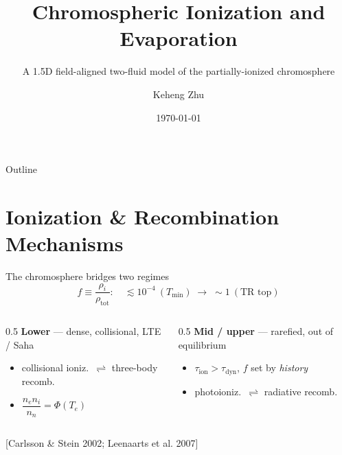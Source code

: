 \documentclass[aspectratio=169]{beamer}
\title[Chromospheric Ionization \& Evaporation]{Chromospheric Ionization and Evaporation}
\subtitle{A 1.5D field-aligned two-fluid model of the partially-ionized chromosphere}
\author{Keheng Zhu}
\institute{University of Michigan}
\date{\today}
\newcommand{\cit}[1]{{\scriptsize\color{gray}[#1]}}
\begin{document}
{
\begin{frame}\titlepage\end{frame}}

\begin{frame}{Outline}
  \tableofcontents
\end{frame}

\section{Ionization \& Recombination Mechanisms}
\begin{frame}{The chromosphere bridges two regimes}
  \[
    f \equiv \frac{\rho_i}{\rho_\mathrm{tot}}:\quad
    \lesssim10^{-4}\ (T_\mathrm{min}) \;\longrightarrow\; \sim1\ (\text{TR top})
  \]
  \begin{columns}[T]
  \begin{column}{0.5\textwidth}
    \textbf{Lower} — dense, collisional, \alert{LTE / Saha}
    \begin{itemize}
      \item collisional ioniz.\ $\rightleftharpoons$ \alert{three-body recomb.}
      \item $\dfrac{n_e n_i}{n_n}=\Phi(T_e)$
    \end{itemize}
  \end{column}
  \begin{column}{0.5\textwidth}
    \textbf{Mid / upper} — rarefied, \alert{out of equilibrium}
    \begin{itemize}
      \item $\tau_\mathrm{ion}>\tau_\mathrm{dyn}$, $f$ set by \emph{history}
      \item photoioniz.\ $\rightleftharpoons$ radiative recomb.
    \end{itemize}
  \end{column}
  \end{columns}
  \vfill
  \cit{Carlsson \& Stein 2002; Leenaarts et al. 2007}
\end{frame}
\end{document}
